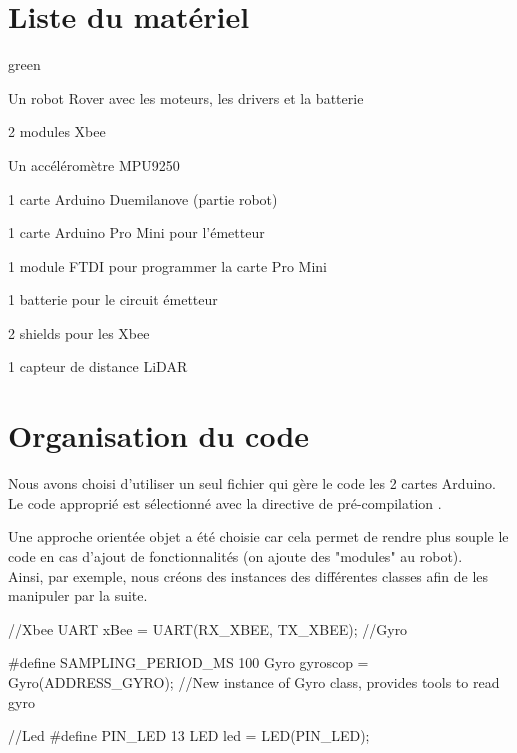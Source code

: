 \section{Liste du matériel}

\begin{items}{green}{\faLeaf}
    \item Un robot Rover avec les moteurs, les drivers et la batterie
    
     
    \item 2 modules Xbee
    \item Un accéléromètre MPU9250
    \item 1 carte Arduino Duemilanove (partie robot)
    \item 1 carte Arduino Pro Mini pour l'émetteur
    \item 1 module FTDI pour programmer la carte Pro Mini
    \item 1 batterie pour le circuit émetteur 
    \item 2 shields pour les Xbee
    \item 1 capteur de distance LiDAR
\end{items}

\section{Organisation du code}

Nous avons choisi d'utiliser un seul fichier qui gère le code les 2 cartes Arduino. Le code approprié est sélectionné avec la directive de pré-compilation .

Une approche orientée objet a été choisie car cela permet de rendre plus souple le code en cas d'ajout de fonctionnalités (on ajoute des "modules" au robot).\\

Ainsi, par exemple, nous créons des instances des différentes classes afin de les manipuler par la suite.
\begin{Cpp}

  //Xbee
  UART xBee = UART(RX_XBEE, TX_XBEE);
  //Gyro
  
  #define SAMPLING_PERIOD_MS 100
  Gyro gyroscop = Gyro(ADDRESS_GYRO);   //New instance of Gyro class, provides tools to read gyro
  
  //Led
  #define PIN_LED 13
  LED led = LED(PIN_LED);    
\end{Cpp}


